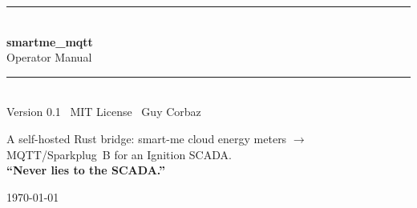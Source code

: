 \documentclass[11pt,a4paper,DIV=11,parskip=half-,numbers=noenddot,listof=totoc,bibliography=totoc]{scrreprt}
\begin{document}
\begin{titlepage}
\sffamily\raggedright
\vspace*{3.5cm}
{\color{accent}\rule{\linewidth}{2pt}}\\[0.5cm]
{\Huge\bfseries smartme\_mqtt}\\[0.35cm]
{\LARGE Operator Manual}\\[0.35cm]
{\color{accent}\rule{\linewidth}{0.8pt}}\\[0.3cm]
{\large Version 0.1 \textperiodcentered\ MIT License \textperiodcentered\ Guy Corbaz}\par
\vfill
{\normalsize A self-hosted Rust bridge: smart-me cloud energy meters $\rightarrow$
MQTT/Sparkplug~B for an Ignition SCADA.}\\[0.3cm]
{\large\bfseries\color{accentdark}“Never lies to the SCADA.”}\par
\vspace{1.5cm}
{\small\color{muted}\today}
\end{titlepage}

\tableofcontents
\cleardoublepage










\appendix


\end{document}

